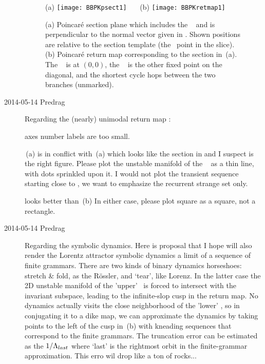 \begin{description}
\begin{figure}%
  \begin{center}
   (a) \texttt{[image: BBPKpsect1]}
~~~(b) \texttt{[image: BBPKretmap1]}
  \end{center}
  \caption{
(a) Poincar\'e section plane which includes the \reqv\   and
	is perpendicular to the normal vector given in .
	Shown positions are relative to the section template
   (the \reqv\ point in the slice).
(b) 	Poincar\'e return map corresponding to the section in
    \,(a). The \eqv\  is at $(0,0)$, the
    \reqv\  is the other fixed point on the diagonal, and the
    shortest cycle  hops between the two branches (unmarked).
    }
  \label{fig:BBPKpsect1}
\end{figure}


\item[2014-05-14 Predrag] Regarding the (nearly)
unimodal return map :

 axes number labels are too small.

\,(a) is in conflict with
\,(a) which looks like the section in
 and I suspect is the right figure. Please plot the
unstable manifold of the \reqv\   as a thin line, with
dots sprinkled upon it. I would not plot the transient sequence starting
close to , we want to emphasize the recurrent strange set
only.

 looks better than
\,(b) In either case, please plot square as a
square, not a rectangle.

\item[2014-05-14 Predrag] Regarding the symbolic dynamics. Here is
proposal that I hope will also render the Lorentz attractor symbolic
dynamics a limit of a sequence of finite grammars. There are two kinds of
binary dynamics horseshoes: stretch \& fold, as the R\"ossler, and
`tear', like Lorenz. In the latter case the 2D unstable manifold of the
'upper' \eqv\ is forced to intersect with the invariant subspace, leading
to the infinite-slop cusp in the return map. No dynamics actually visits
the close neighborhood of the 'lower' \eqv, so in conjugating it to a
dike map, we can approximate the dynamics by taking points to the left of
the cusp in \,(b) with kneading sequences that
correspond to the finite grammars. The truncation error can be estimated
as the $1/\Lambda_{last}$ where `last' is the rightmost orbit in the
finite-grammar approximation. This erro wil drop like a ton of rocks...


\end{description}
